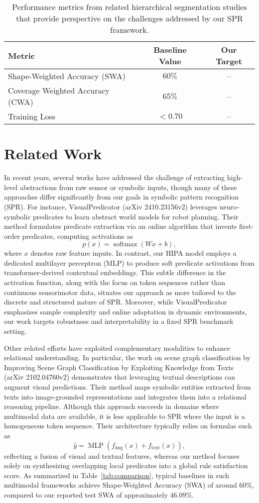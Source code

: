 \documentclass[11pt]{article}
\begin{document}
\begin{table}[h]
\centering
\begin{tabular}{lcc}
\hline
Metric & Baseline Value & Our Target\\
\hline
Shape-Weighted Accuracy (SWA) & \(60\%\) & -- \\
Coverage Weighted Accuracy (CWA) & \(65\%\) & -- \\
Training Loss & \(<0.70\) & -- \\
\hline
\end{tabular}
\caption{Performance metrics from related hierarchical segmentation studies that provide perspective on the challenges addressed by our SPR framework.}
\label{tab:background}
\end{table}

\section{Related Work}
In recent years, several works have addressed the challenge of extracting high-level abstractions from raw sensor or symbolic inputs, though many of these approaches differ significantly from our goals in symbolic pattern recognition (SPR). For instance, VisualPredicator (arXiv 2410.23156v2) leverages neuro‐symbolic predicates to learn abstract world models for robot planning. Their method formulates predicate extraction via an online algorithm that invents first-order predicates, computing activations as 
\[
p(x) = \operatorname{softmax}(W x + b),
\]
where \(x\) denotes raw feature inputs. In contrast, our HIPA model employs a dedicated multilayer perceptron (MLP) to produce soft predicate activations from transformer‐derived contextual embeddings. This subtle difference in the activation function, along with the focus on token sequences rather than continuous sensorimotor data, situates our approach as more tailored to the discrete and structured nature of SPR. Moreover, while VisualPredicator emphasizes sample complexity and online adaptation in dynamic environments, our work targets robustness and interpretability in a fixed SPR benchmark setting.

Other related efforts have exploited complementary modalities to enhance relational understanding. In particular, the work on scene graph classification by Improving Scene Graph Classification by Exploiting Knowledge from Texts (arXiv 2102.04760v2) demonstrates that leveraging textual descriptions can augment visual predictions. Their method maps symbolic entities extracted from texts into image-grounded representations and integrates them into a relational reasoning pipeline. Although this approach succeeds in domains where multimodal data are available, it is less applicable to SPR where the input is a homogeneous token sequence. Their architecture typically relies on formulas such as
\[
\hat{y} = \operatorname{MLP}(f_{\text{img}}(x) + f_{\text{text}}(x)),
\]
reflecting a fusion of visual and textual features, whereas our method focuses solely on synthesizing overlapping local predicates into a global rule satisfaction score. As summarized in Table~\ref{tab:comparison}, typical baselines in such multimodal frameworks achieve Shape-Weighted Accuracy (SWA) of around \(60\%\), compared to our reported test SWA of approximately \(46.09\%\).
\end{document}
